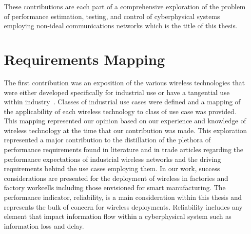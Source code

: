 These contributions are each part of a comprehensive exploration of the problem of performance estimation, testing, and control of cyberphysical systems employing non-ideal communications networks which is the title of this thesis.  

\section{Requirements Mapping}

The first contribution was an exposition of the various wireless technologies that were either developed specifically for industrial use or have a tangential use within industry~\cite{CandellRW2017}.  Classes of industrial use cases were defined and a mapping of the applicability of each wireless technology to class of use case was provided.  This mapping represented our opinion based on our experience and knowledge of wireless technology at the time that our contribution was made.  This exploration represented a major contribution to the distillation of the plethora of performance requirements found in literature and in trade articles regarding the performance expectations of industrial wireless networks and the driving requirements behind the use cases employing them.  In our work, success considerations are presented for the deployment of wireless in factories and factory workcells including those envisioned for smart manufacturing.  The performance indicator, reliability, is a main consideration within this thesis and represents the bulk of  concern for wireless deployments.  Reliability includes any element that impact information flow within a cyberphysical system such as information loss and delay.  

